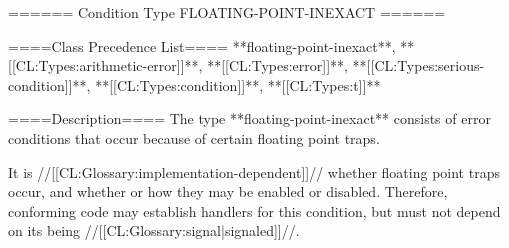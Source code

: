 ====== Condition Type FLOATING-POINT-INEXACT ======

====Class Precedence List==== 
**floating-point-inexact**, **[[CL:Types:arithmetic-error]]**, **[[CL:Types:error]]**, **[[CL:Types:serious-condition]]**, **[[CL:Types:condition]]**, **[[CL:Types:t]]**

====Description====
The type **floating-point-inexact** consists of error conditions that occur because of certain floating point traps.

It is //[[CL:Glossary:implementation-dependent]]// whether floating point traps occur, and whether or how they may be enabled or disabled. Therefore, conforming code may establish handlers for this condition, but must not depend on its being //[[CL:Glossary:signal|signaled]]//.

